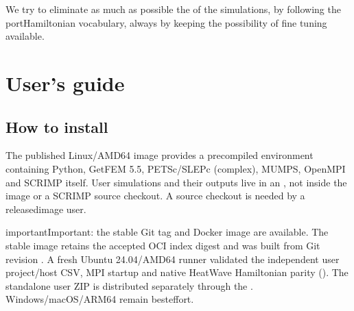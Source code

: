 \documentclass[letterpaper,10pt,english]{sphinxmanual}
\begin{document}
\sphinxAtStartPar
We try to eliminate as much as possible the  of the simulations, by following the port\sphinxhyphen{}Hamiltonian vocabulary, always by keeping the possibility of fine tuning available.


\chapter{User’s guide}
\label{\detokenize{index:user-s-guide}}
\sphinxstepscope


\section{How to install}
\label{\detokenize{install:how-to-install}}\label{\detokenize{install::doc}}
\sphinxAtStartPar
{}
The published Linux/AMD64 image provides a precompiled environment
containing Python, GetFEM 5.5, PETSc/SLEPc (complex), MUMPS, OpenMPI and
SCRIMP itself. User simulations and their outputs live in an
, not inside the image or a SCRIMP
source checkout. A source checkout is  needed by a released\sphinxhyphen{}image
user.

\begin{sphinxadmonition}{important}{Important:}
\sphinxAtStartPar
{} the stable Git tag and
  Docker image are available.
The stable image retains the accepted  OCI index digest
and was built from Git revision
.
A fresh Ubuntu 24.04/AMD64 runner validated the independent user
project/host CSV, MPI startup and native Heat\textendash{}Wave Hamiltonian
parity ().
The standalone user ZIP is distributed separately through the
.
Windows/macOS/ARM64 remain best\sphinxhyphen{}effort.
\end{sphinxadmonition}
\end{document}
